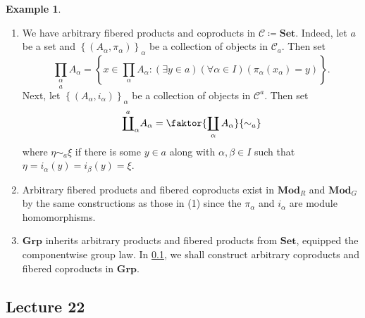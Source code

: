 \documentclass[10pt,letterpaper,cm]{nupset}
\theoremstyle{definition}
\newtheorem{exmp}[definition]{Example}
\theoremstyle{theorem}
\theoremstyle{remark}
\newcommand{\1}{\mathbf{1}}
\renewcommand{\c}{\mathscr{C}}
\newcommand{\0}{\vec 0}
\begin{document}
\begin{exmp}\label{ex32} $ $
\begin{enumerate}[label=(\arabic*)]
\item We have arbitrary fibered products and coproducts in $\c\coloneqq  \mathbf{Set}$. Indeed, let $a$ be a set and $\left\{(A_{\alpha}, \pi_{\alpha})\right\}_{\alpha}$ be a collection of objects in $\c_a$. Then set $$\underset{a}{\prod_{\alpha}} A_{\alpha} = \left\{x \in \prod_{\alpha} A_{\alpha} :  (\exists y \in a)(\forall \alpha \in I)(\pi_{\alpha}(x_{\alpha}) = y)\right\}.$$ Next, let $\left\{(A_{\alpha}, i_{\alpha})\right\}_{\alpha}$ be a collection of objects in $\c^a$. Then set $$ 
\overset{a}{\coprod}_{\alpha}A_{\alpha} = \faktor{\coprod_{\alpha} A_{\alpha}}{\sim_a}$$ where $\eta \sim_a \xi$ if there is some $y \in a$ along with $\alpha, \beta \in I$ such that $\eta = i_{\alpha}(y) = i_{\beta}(y) = \xi$.
\item Arbitrary fibered products and fibered coproducts exist in $\mathbf{Mod}_R$ and $\mathbf{Mod}_G$ by the same constructions as those in (1) since the $\pi_{\alpha}$ and $i_{\alpha}$ are module homomorphisms.
\item $\mathbf{Grp}$ inherits arbitrary products and fibered products from $\mathbf{Set}$, equipped the componentwise group law. In \cref{L22}, we shall construct arbitrary coproducts and fibered coproducts in $\mathbf{Grp}$. 
\end{enumerate}
\end{exmp}

\subsection{Lecture 22}\label{L22}
\end{document}
